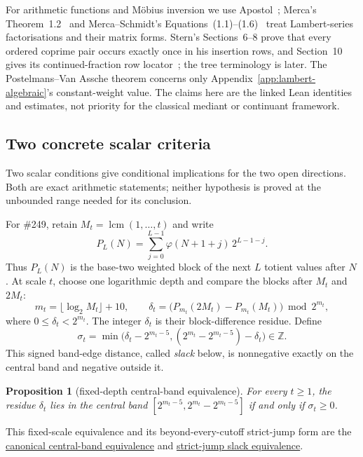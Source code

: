 \documentclass[11pt]{article}
\newcommand{\commit}{bb4e24651b37cd096d3749ef299c3317930b3a3b}
\newcommand{\repobase}{https://github.com/wcook04/plectis-lean-erdos249-257/blob/\commit}
\newcommand{\PK}{Erdos249257}
\newcommand{\lword}[4]{\href{\repobase/\PK/#1\#L#2}{#4}}
\newtheorem{proposition}[theorem]{Proposition}
\theoremstyle{definition}
\theoremstyle{remark}
\newcommand{\Z}{\mathbb{Z}}
\newcommand{\ph}{\varphi}
\newcommand{\lcm}{\operatorname{lcm}}
\begin{document}
{For arithmetic functions and M\"obius inversion we use
Apostol~\cite[\S\S2.6--2.7, pp.~28--32]{apostol};
Merca's Theorem~1.2~\cite[pp.~420--421]{merca2017} and
Merca--Schmidt's Equations~(1.1)--(1.6)~\cite[pp.~31--34]{mercaschmidt}
treat Lambert-series factorisations and their matrix forms.  Stern's
Sections~6--8 prove that every ordered coprime pair occurs exactly once in
his insertion rows, and Section~10 gives its continued-fraction row
locator~\cite[pp.~200--204]{stern1858}; the tree terminology is later.
The Postelmans--Van Assche theorem
concerns only Appendix~\ref{app:lambert-algebraic}'s constant-weight value.
The claims here are the linked Lean identities and estimates, not priority for
the classical mediant or continuant framework.
}

\subsection{Two concrete scalar criteria}

Two scalar conditions give conditional implications for the two open
directions.  Both are exact arithmetic statements; neither hypothesis is
proved at the unbounded range needed for its conclusion.

For \#249, retain $M_t=\lcm(1,\ldots,t)$ and write
\[
 P_L(N)=\sum_{j=0}^{L-1}\ph(N+1+j)\,2^{L-1-j}.
\]
Thus \(P_L(N)\) is the base-two weighted block of the next \(L\) totient
values after \(N\).  At scale \(t\), choose one logarithmic depth and compare
the blocks after \(M_t\) and \(2M_t\):
\[
 m_t=\lfloor\log_2 M_t\rfloor+10,\qquad
 \delta_t=\bigl(P_{m_t}(2M_t)-P_{m_t}(M_t)\bigr)\bmod 2^{m_t},
\]
where $0\le \delta_t<2^{m_t}$.  The integer \(\delta_t\) is their block-difference
residue.  Define
\[
  \sigma_t=\min\bigl(\delta_t-2^{m_t-5},
    (2^{m_t}-2^{m_t-5})-\delta_t\bigr)\in\Z.
\]
This signed band-edge distance, called \emph{slack} below, is nonnegative
exactly on the central band and negative outside it.

\begin{proposition}[fixed-depth central-band equivalence]\label{res:slackfrontier}
For every $t\ge1$, the residue \(\delta_t\) lies in the central band
$[2^{m_t-5},2^{m_t}-2^{m_t-5}]$ if and only if $\sigma_t\ge0$.
\end{proposition}
\noindent This fixed-scale equivalence and its beyond-every-cutoff strict-jump
form are the
\lword{DiagonalFreshLossBridge.lean}{2667}{canonicalAdjacentSuffixCentral_iff_slack_nonneg}{canonical central-band equivalence}
and
\lword{DiagonalFreshLossBridge.lean}{2757}{canonicalAdjacentSuffixJumpCentralSupply_iff_slackSupply}{strict-jump slack equivalence}.
\end{document}

